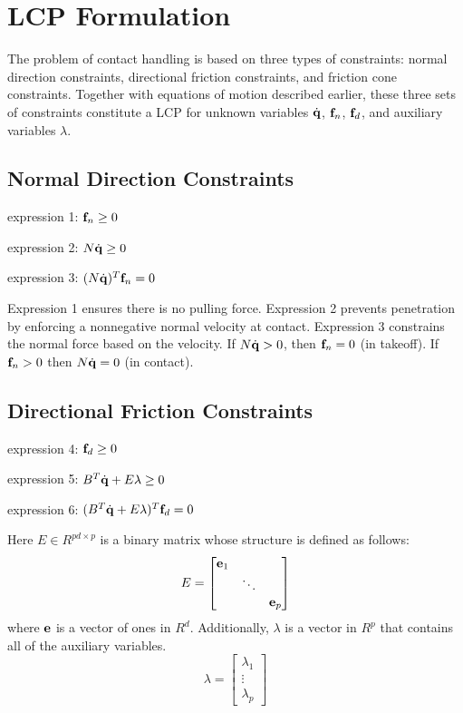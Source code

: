 \section{LCP Formulation}
The problem of contact handling is based on three types of
constraints: normal direction constraints, directional friction constraints,
and friction cone constraints. Together with equations of
motion described earlier, these three sets of constraints constitute a
LCP for unknown variables $\dot{\mathbf{q}}$, $\mathbf{f}_n$, $\mathbf{f}_d$, and
auxiliary variables $\lambda$.

\subsection{Normal Direction Constraints}
\begin{packed_item}
\item{expression 1:} $\mathbf{f}_n \geq 0$
\item{expression 2:} $N \dot{\mathbf{q}} \geq 0$
\item{expression 3:} $(N \dot{\mathbf{q}})^T\mathbf{f}_n = 0$
\end{packed_item}
Expression 1 ensures there is no pulling force. Expression 2 prevents
penetration by enforcing a nonnegative normal velocity at
contact. Expression 3 constrains the normal force based on the
velocity. If $N \dot{\mathbf{q}} > 0$, then $\mathbf{f}_n = 0$ (in
takeoff). If $\mathbf{f}_n > 0$ then $N \dot{\mathbf{q}} = 0$ (in contact).

\subsection{Directional Friction Constraints}
\begin{packed_item}
\item{expression 4:} $\mathbf{f}_d \geq 0$
\item{expression 5:} $B^T\dot{\mathbf{q}} + E\lambda \geq 0$
\item{expression 6:} $(B^T\dot{\mathbf{q}} + E\lambda)^T\mathbf{f}_d = 0$
\end{packed_item}
Here $E \in R^{pd \times p}$ is a binary matrix whose structure is
defined as follows: 
\begin{equation}
\label{eq:ematrix}
E = \left[\begin{matrix}\mathbf{e}_1 & & \\  & \ddots & \\  & & \mathbf{e}_p \end{matrix}\right]
\end{equation}
where $\mathbf{e}$ is a vector of ones in
$R^d$. Additionally, $\lambda$ is a vector in $R^p$ that contains all
of the auxiliary variables.
\begin{equation}
\label{eq:lambda}
\lambda = \left[\begin{matrix}\lambda_1 \\  \vdots \\ \lambda_p\end{matrix}\right]
\end{equation}


